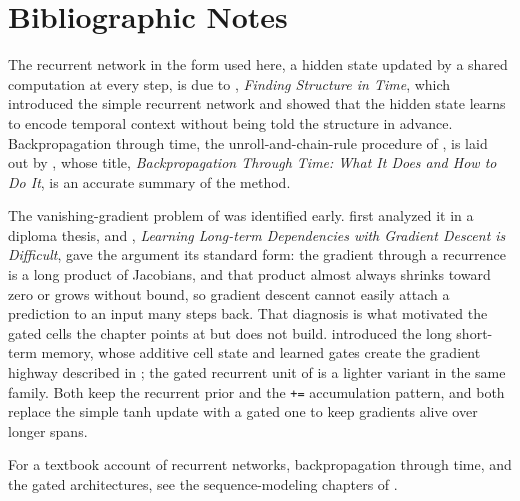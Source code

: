 
\section*{Bibliographic Notes}

The recurrent network in the form used here, a hidden state updated by a
shared computation at every step, is due to \textcite{elman1990},
\emph{Finding Structure in Time}, which introduced the simple recurrent
network and showed that the hidden state learns to encode temporal context
without being told the structure in advance. Backpropagation through time,
the unroll-and-chain-rule procedure of , is laid out by
\textcite{werbos1990bptt}, whose title, \emph{Backpropagation Through Time:
What It Does and How to Do It}, is an accurate summary of the method.

The vanishing-gradient problem of  was
identified early. \textcite{hochreiter1991} first analyzed it in a diploma
thesis, and \textcite{bengio1994longterm}, \emph{Learning Long-term
Dependencies with Gradient Descent is Difficult}, gave the argument its
standard form: the gradient through a recurrence is a long product of
Jacobians, and that product almost always shrinks toward zero or grows
without bound, so gradient descent cannot easily attach a prediction to an
input many steps back. That diagnosis is what motivated the gated cells the
chapter points at but does not build. \textcite{hochreiter1997lstm}
introduced the long short-term memory, whose additive cell state and learned
gates create the gradient highway described in
; the gated recurrent unit of
\textcite{cho2014gru} is a lighter variant in the same family. Both keep the
recurrent prior and the \texttt{+=} accumulation pattern, and both replace
the simple tanh update with a gated one to keep gradients alive over longer
spans.

For a textbook account of recurrent networks, backpropagation through time,
and the gated architectures, see the sequence-modeling chapters of
\textcite{goodfellow2016dlbook}.
